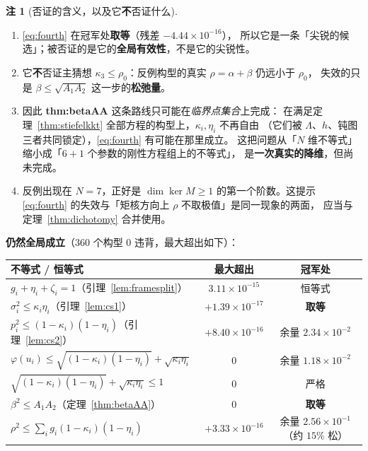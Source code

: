 \documentclass[UTF8,11pt]{ctexart}
\theoremstyle{definition}
\newtheorem{remark}[theorem]{注}
\newcommand{\Lam}{\Lambda}
\begin{document}
\begin{remark}[否证的含义，以及它\textbf{不}否证什么]\label{rmk:fourthmean}
\begin{enumerate}\itemsep2pt
\item \eqref{eq:fourth} 在冠军处\textbf{取等}（残差 $-4.44\times10^{-16}$），
所以它是一条「尖锐的候选」；被否证的是它的\textbf{全局有效性}，不是它的尖锐性。
\item 它\textbf{不}否证主猜想 $\kappa_3\le\rho_0$：反例构型的真实 $\rho=\alpha+\beta$ 仍远小于 $\rho_0$，
失效的只是 $\beta\le\sqrt{A_1A_2}$ 这一步的\textbf{松弛量}。
\item 因此 \textbf{thm:betaAA} 这条路线只可能在\emph{临界点集合}上完成：
在满足定理~\ref{thm:stiefelkkt} 全部方程的构型上，$\kappa_i,\eta_i$ 不再自由
（它们被 $\Lam$、$h$、钝图三者共同锁定），\eqref{eq:fourth} 有可能在那里成立。
这把问题从「$N$ 维不等式」缩小成「$6+1$ 个参数的刚性方程组上的不等式」，
是\textbf{一次真实的降维}，但尚未完成。
\item 反例出现在 $N=7$，正好是 $\dim\ker M\ge1$ 的第一个阶数。这提示
\eqref{eq:fourth} 的失效与「矩核方向上 $\rho$ 不取极值」是同一现象的两面，
应当与定理~\ref{thm:dichotomy} 合并使用。
\end{enumerate}
\end{remark}

\textbf{仍然全局成立}（$360$ 个构型 $0$ 违背，最大超出如下）：
\begin{center}\small
\begin{tabular}{lcc}
\hline
不等式 / 恒等式 & 最大超出 & 冠军处 \\
\hline
$g_i+\eta_i+\zeta_i=1$（引理~\ref{lem:framesplit}） & $3.11\times10^{-15}$ & 恒等式 \\
$\sigma_i^2\le\kappa_i\eta_i$（引理~\ref{lem:cs1}） & $+1.39\times10^{-17}$ & \textbf{取等} \\
$p_i^2\le(1-\kappa_i)(1-\eta_i)$（引理~\ref{lem:cs2}） & $+8.40\times10^{-16}$ & 余量 $2.34\times10^{-2}$ \\
$\varphi(u_i)\le\sqrt{(1-\kappa_i)(1-\eta_i)}+\sqrt{\kappa_i\eta_i}$ & $0$ & 余量 $1.18\times10^{-2}$ \\
$\sqrt{(1-\kappa_i)(1-\eta_i)}+\sqrt{\kappa_i\eta_i}\le1$ & $0$ & 严格 \\
$\beta^2\le A_1A_2$（定理~\ref{thm:betaAA}） & $0$ & \textbf{取等} \\
$\rho^2\le\sum_ig_i(1-\kappa_i)(1-\eta_i)$ & $+3.33\times10^{-16}$ & 余量 $2.56\times10^{-1}$（约 $15\%$ 松） \\
\hline
\end{tabular}
\end{center}
\end{document}
